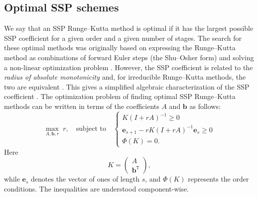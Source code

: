 \subsection{Optimal SSP schemes}\label{subsec:Optimal_SSPRK}
We say that an SSP Runge--Kutta method is optimal if it has the largest 
possible SSP coefficient for a given order and a given number of stages.
The search for these optimal methods was originally based on
expressing the Runge--Kutta method as combinations of forward Euler
steps (the Shu--Osher form) and solving a non-linear optimization
problem \cite{Gottlieb/Shu:1998, Gottlieb2001, Spiteri2003a, Spiteri2003b, 
Ruuth2004, Ruuth:2006}.
However, the SSP coefficient is related to the 
\emph{radius of absolute monotonicity} \cite{Kraaijevanger1991} and, 
for irreducible Runge--Kutta methods, the two are equivalent 
\cite{Ferracina2004, Higueras2004}.
This gives a simplified algebraic characterization of the SSP coefficient
\cite{Ferracina2005}.
The optimization problem of finding optimal SSP Runge--Kutta methods
can be written in terms of the coefficients $A$ and $\bm{b}$ as
follows:
\begin{equation}\label{eq:SSP_opt}
    \max_{A, \bm{b}, r} \; r, \quad \text{subject to} \quad \left\{
                                                 \begin{array}{ll}
                                                   K(I + rA)^{-1} \geq 0 \\
                                                   \bm{e}_{s+1} - rK(I + rA)^{-1}\bm{e}_{s} \geq 0 \\
                                                   \Phi(K) = 0.
                                                 \end{array}
                                               \right.
\end{equation}
Here
\begin{equation*}
    K = \left(
            \begin{array}{c}
                     A              \\
                     \bm{b}^{\texttt{T}}
            \end{array}
         \right),
\end{equation*}
while $\bm{e}_s$ denotes the vector of ones of length $s$,
and \( \Phi(K) \) represents the  order conditions.
The inequalities are understood component-wise.


